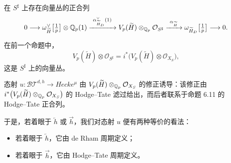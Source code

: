 \begin{proposition}
在 $S^\sharp$ 上存在向量丛的正合列
\[
0\longrightarrow\omega^\vee_{\widetilde{H}}\bigl[\tfrac1p\bigr]\otimes\mathbb{Q}_p(1)
\xrightarrow{\ \alpha^\vee_{\widetilde{H}_D}(1)\ }
V_p(\widetilde{H})\otimes_{\mathbb{Q}_p}\mathcal{O}_{S^\sharp}
\xrightarrow{\ \alpha_{\widetilde{H}}\ }
\omega_{\widetilde{H}_D}\bigl[\tfrac1p\bigr]\longrightarrow0.
\]
\end{proposition}

在前一个命题中，
\[
V_p(\widetilde{H})\otimes\mathcal{O}_{S^\sharp}
=i^*\bigl(V_p(\widetilde{H})\otimes\mathcal{O}_{X_S}\bigr),
\]
这是 $S^\sharp$ 上的向量丛。

\begin{proposition}
态射 $u:\mathcal{BT}^{d,h}\to Hecke^\mu$ 由 $V_p(\widetilde{H})\otimes_{\mathbb{Q}_p}\mathcal{O}_{X_S}$ 的修正诱导：该修正由 $i^*\bigl(V_p(\widetilde{H})\otimes_{\mathbb{Q}_p}\mathcal{O}_{X_S}\bigr)$ 的 Hodge--Tate 滤过给出，而后者联系于命题 6.11 的 Hodge--Tate 正合列。
\end{proposition}

于是，若着眼于 $\overleftarrow{h}$ 或 $\overrightarrow{h}$，我们对态射 $u$ 便有两种等价的看法：
\begin{itemize}
\item 若着眼于 $\overleftarrow{h}$，它由 de Rham 周期定义；
\item 若着眼于 $\overrightarrow{h}$，它由 Hodge--Tate 周期定义。
\end{itemize}

